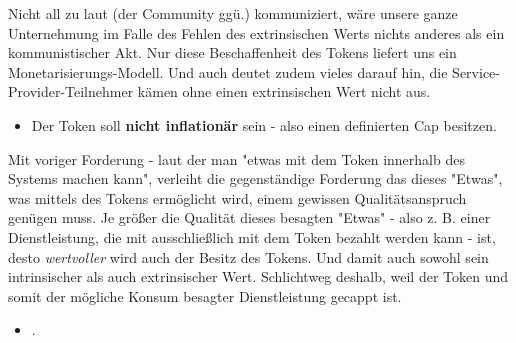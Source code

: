 \begin{Praemisse}
\vspace{0.2cm}

Nicht all zu laut (der Community ggü.) kommuniziert, wäre unsere ganze Unternehmung im Falle des Fehlen des extrinsischen Werts nichts anderes als ein kommunistischer Akt. Nur diese Beschaffenheit des Tokens liefert uns ein Monetarisierungs-Modell. Und auch deutet zudem vieles darauf hin, die Service-Provider-Teilnehmer kämen ohne einen extrinsischen Wert nicht aus.

\vspace{0.3cm}

\begin{itemize}
  \item Der Token soll \textbf{nicht inflationär} sein - also einen definierten Cap besitzen.
\end{itemize}

\vspace{0.2cm}

Mit voriger Forderung - laut der man "etwas mit dem Token innerhalb des Systems machen kann", verleiht die gegenständige Forderung das dieses "Etwas", was mittels des Tokens ermöglicht wird, einem gewissen Qualitätsanspruch genügen muss. Je größer die Qualität dieses besagten "Etwas" - also z. B. einer Dienstleistung, die mit ausschließlich mit dem Token bezahlt werden kann - ist, desto \textit{wertvoller} wird auch der Besitz des Tokens. Und damit auch sowohl sein intrinsischer als auch extrinsischer Wert. Schlichtweg deshalb, weil der Token und somit der mögliche Konsum besagter Dienstleistung gecappt ist.

\vspace{0.3cm}

\begin{itemize}
  \item {}.
\end{itemize}

\vspace{0.2cm}


\end{Praemisse}

\vspace{0.3cm}


